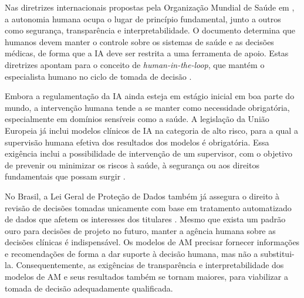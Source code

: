 Nas diretrizes internacionais propostas pela Organização Mundial de Saúde em \citeyear{who2021ethics}, a autonomia humana ocupa o lugar de princípio fundamental, junto a outros como segurança, transparência e interpretabilidade. O documento determina que humanos devem manter o controle sobre os sistemas de saúde e as decisões médicas, de forma que a IA deve ser restrita a uma ferramenta de apoio. Estas diretrizes apontam para o conceito de \textit{human-in-the-loop}, que mantém o especialista humano no ciclo de tomada de decisão \cite{who2021ethics}.

Embora a regulamentação da IA ainda esteja em estágio inicial em boa parte do mundo, a intervenção humana tende a se manter como necessidade obrigatória, especialmente em domínios sensíveis como a saúde. A legislação da União Europeia já inclui modelos clínicos de IA na categoria de alto risco, para a qual a supervisão humana efetiva dos resultados dos modelos é obrigatória. Essa exigência inclui a possibilidade de intervenção de um supervisor, com o objetivo de prevenir ou minimizar os riscos à saúde, à segurança ou aos direitos fundamentais que possam surgir \cite{eu2024aiact}.

No Brasil, a Lei Geral de Proteção de Dados também já assegura o direito à revisão de decisões tomadas unicamente com base em tratamento automatizado de dados que afetem os interesses dos titulares \cite{brasil2018lgpd}. Mesmo que exista um padrão ouro para decisões de projeto no futuro, manter a agência humana sobre as decisões clínicas é indispensável. Os modelos de AM precisar fornecer informações e recomendações de forma a dar suporte à decisão humana, mas não a substitui-la. Consequentemente, as exigências de transparência e interpretabilidade dos modelos de AM e seus resultados também se tornam maiores, para viabilizar a tomada de decisão adequadamente qualificada.
